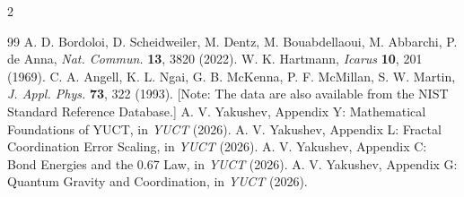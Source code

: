 \documentclass[11pt,a4paper]{article}
\begin{document}
\begin{multicols}{2}
		\begin{thebibliography}{99}
			 A. D. Bordoloi, D. Scheidweiler, M. Dentz, M. Bouabdellaoui, M. Abbarchi, P. de Anna, \emph{Nat. Commun.} \textbf{13}, 3820 (2022).
			 W. K. Hartmann, \emph{Icarus} \textbf{10}, 201 (1969).
			 C. A. Angell, K. L. Ngai, G. B. McKenna, P. F. McMillan, S. W. Martin, \emph{J. Appl. Phys.} \textbf{73}, 322 (1993). [Note: The data are also available from the NIST Standard Reference Database.]
			 A. V. Yakushev, Appendix Y: Mathematical Foundations of YUCT, in \emph{YUCT} (2026).
			 A. V. Yakushev, Appendix L: Fractal Coordination Error Scaling, in \emph{YUCT} (2026).
			 A. V. Yakushev, Appendix C: Bond Energies and the 0.67 Law, in \emph{YUCT} (2026).
			 A. V. Yakushev, Appendix G: Quantum Gravity and Coordination, in \emph{YUCT} (2026).
		\end{thebibliography}
		
	\end{multicols}
\end{document}
